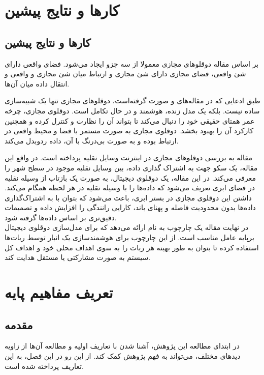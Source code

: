\chapter{کار‌ها و نتایج پیشین}

\section{کار‌ها و نتایج پیشین}


بر اساس مقاله 
\cite{b7}
دوقلو‌های مجازی معمولا از سه جزو ایجاد می‌شود. فضای واقعی دارای شئ واقعی، فضای مجازی دارای شئ مجازی و ارتباط میان شئ مجازی و واقعی و انتقال داده ‌میان آن‌ها.

طبق ادعایی که در مقاله‌های 
\cite{b8}
و
\cite{b9}
صورت گرفته‌است، دوقلو‌های مجازی تنها یک شبیه‌سازی ساده نیست. بلکه یک مدل زنده، هوشمند و در حال تکامل است. دوقلوی مجازی، چرخه عمر همتای حقیقی خود را دنبال می‌کند تا بتواند آن را نظارت
و کنترل
کرده و همچنین کارکرد آن را بهبود بخشد. دوقلوی مجازی به صورت مستمر با فضا و محیط واقعی در ارتباط بوده و به صورت بی‌درنگ با آن، داده‌ ردوبدل می‌کند.


مقاله 
\cite{b10}
به بررسی دوقلو‌های مجازی در اینترنت وسایل‌ نقلیه
پرداخته است. در واقع این مقاله، یک سکو
جهت به اشتراک گذاری داده، بین وسایل نقلیه موجود در سطح شهر را معرفی می‌کند. در این مقاله، یک دوقلوی دیجیتال، به صورت یک بازتاب از وسیله نقلیه در فضای ابری تعریف می‌شود که داده‌ها را با وسیله نقلیه در هر لحظه همگام می‌کند. داشتن این دوقلوی مجازی در بستر ابری، باعث می‌شود که بتوان با به اشتراک‌گذاری داده‌ها بدون محدودیت فاصله و پهنای باند، کارایی رانندگی را افزایش داده و تصمیمات دقیق‌تری بر اساس داده‌ها گرفته‌ شود.\\
در نهایت مقاله 
\cite{b11}
یک چارچوب
به نام 
ارائه می‌دهد که برای مدل‌سازی دوقلوی دیجیتال برپایه عامل‌
مناسب است. از این چارچوب برای هوشمند‌سازی یک انبار‌ توسط ربات‌ها استفاده کرده تا بتوان به طور بهینه هر ربات را به سوی اهداف محلی خود و اهداف کل سیستم به صورت مشارکتی یا مستقل هدایت کند.

\chapter{تعریف مفاهیم پایه}
\section{مقدمه}
در ابتدای مطالعه این پژوهش، آشنا شدن با تعاریف اولیه و مطالعه آن‌ها از زاویه دید‌های مختلف، می‌تواند به فهم پژوهش کمک کند. از این رو در این فصل، به این تعاریف پرداخته شده است.
